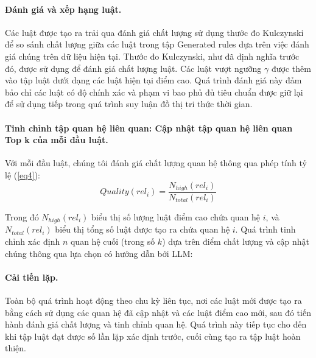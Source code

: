 \paragraph{Đánh giá và xếp hạng luật.}
Các luật được tạo ra trải qua đánh giá chất lượng sử dụng thước đo Kulczynski để so sánh chất lượng giữa các luật trong tập Generated rules dựa trên việc đánh giá chúng trên dữ liệu hiện tại. Thước đo Kulczynski, như đã định nghĩa trước đó, được sử dụng để đánh giá chất lượng luật. Các luật vượt ngưỡng $\gamma$ được thêm vào tập luật dưới dạng các luật hiện tại điểm cao. Quá trình đánh giá này đảm bảo chỉ các luật có độ chính xác và phạm vi bao phủ đủ tiêu chuẩn được giữ lại để sử dụng tiếp trong quá trình suy luận đồ thị tri thức thời gian.

\paragraph{Tinh chỉnh tập quan hệ liên quan: Cập nhật tập quan hệ liên quan Top k của mỗi đầu luật.}
Với mỗi đầu luật, chúng tôi đánh giá chất lượng quan hệ thông qua phép tính tỷ lệ (\ref{eq4}):
\begin{equation}
    \label{eq4}
    Quality(rel_i) = \frac{N_{high}(rel_i)}{N_{total}(rel_i)}
\end{equation}

Trong đó $N_{high}(rel_i)$ biểu thị số lượng luật điểm cao chứa quan hệ $i$, và $N_{total}(rel_i)$ biểu thị tổng số luật được tạo ra chứa quan hệ $i$. Quá trình tinh chỉnh xác định $n$ quan hệ cuối (trong số $k$) dựa trên điểm chất lượng và cập nhật chúng thông qua lựa chọn có hướng dẫn bởi LLM:
\paragraph{Cải tiến lặp.}
Toàn bộ quá trình hoạt động theo chu kỳ liên tục, nơi các luật mới được tạo ra bằng cách sử dụng các quan hệ đã cập nhật và các luật điểm cao mới, sau đó tiến hành đánh giá chất lượng và tinh chỉnh quan hệ. Quá trình này tiếp tục cho đến khi tập luật đạt được số lần lặp xác định trước, cuối cùng tạo ra tập luật hoàn thiện.


